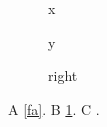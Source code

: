 \documentclass{article}
\begin{document}
\begin{figure}
\begin{minipage}{4cm}x\caption{left}\label{fa}\end{minipage}\hfill\begin{minipage}{4cm}y\caption{right}\label{fb}\end{minipage}
\end{figure}
A \cref{fa}. B \cref{fb}. C .
\end{document}
